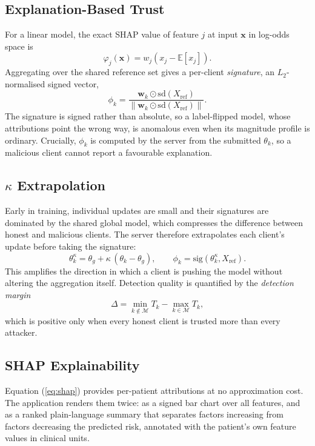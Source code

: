 \documentclass[10pt,twocolumn,letterpaper]{article}
\begin{document}
\subsection{Explanation-Based Trust}
\label{sec:expltrust}
For a linear model, the exact SHAP value of feature $j$ at input
$\mathbf{x}$ in log-odds space is
\begin{equation}
 \varphi_j(\mathbf{x}) = w_j\left(x_j - \mathbb{E}[x_j]\right).
 \label{eq:shap}
\end{equation}
Aggregating over the shared reference set gives a per-client
\emph{signature}, an $L_2$-normalised signed vector,
\begin{equation}
 \phi_k = \frac{\mathbf{w}_k \odot \mathrm{sd}(X_{\mathrm{ref}})}
 {\lVert \mathbf{w}_k \odot \mathrm{sd}(X_{\mathrm{ref}})\rVert}.
 \label{eq:signature}
\end{equation}
The signature is signed rather than absolute, so a label-flipped model, whose
attributions point the wrong way, is anomalous even when its magnitude
profile is ordinary. Crucially, $\phi_k$ is computed by the server from the
submitted $\theta_k$, so a malicious client cannot report a favourable
explanation.

\subsection{$\kappa$ Extrapolation}
Early in training, individual updates are small and their signatures are
dominated by the shared global model, which compresses the difference
between honest and malicious clients. The server therefore extrapolates each
client's update before taking the signature:
\begin{equation}
 \theta_k^{\kappa} = \theta_g + \kappa\,(\theta_k - \theta_g),
 \qquad
 \phi_k = \mathrm{sig}\!\left(\theta_k^{\kappa}, X_{\mathrm{ref}}\right).
 \label{eq:kappa}
\end{equation}
This amplifies the direction in which a client is pushing the model without
altering the aggregation itself. Detection quality is quantified by the
\emph{detection margin}
\begin{equation}
 \Delta = \min_{k \notin \mathcal{M}} T_k - \max_{k \in \mathcal{M}} T_k,
 \label{eq:margin}
\end{equation}
which is positive only when every honest client is trusted more than every
attacker.

\subsection{SHAP Explainability}
Equation (\ref{eq:shap}) provides per-patient attributions at no
approximation cost. The application renders them twice: as a signed bar chart
over all features, and as a ranked plain-language summary that separates
factors increasing from factors decreasing the predicted risk, annotated with
the patient's own feature values in clinical units.
\end{document}
